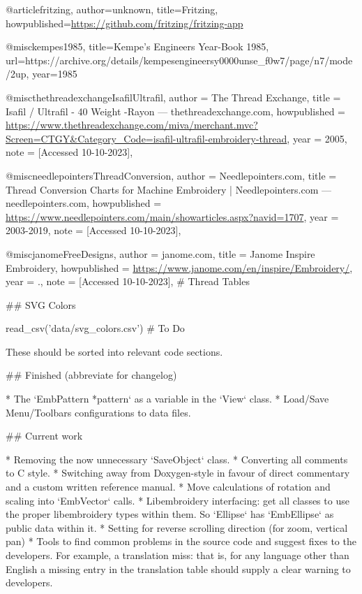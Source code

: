 @article{fritzing,
    author={unknown},
    title={Fritzing},
    howpublished={\url{https://github.com/fritzing/fritzing-app}}
}



@misc{kempes1985,
    title={Kempe's Engineers Year-Book 1985},
    url={https://archive.org/details/kempesengineersy0000unse_f0w7/page/n7/mode/2up},
    year={1985}
}

@misc{thethreadexchangeIsafilUltrafil,
	author = {The Thread Exchange},
	title = {{I}safil / {U}ltrafil - 40 {W}eight -{R}ayon --- thethreadexchange.com},
	howpublished = {\url{https://www.thethreadexchange.com/miva/merchant.mvc?Screen=CTGY&Category_Code=isafil-ultrafil-embroidery-thread}},
	year = {2005},
	note = {[Accessed 10-10-2023]},
}

@misc{needlepointersThreadConversion,
	author = {Needlepointers.com},
	title = {{T}hread {C}onversion {C}harts for {M}achine {E}mbroidery | {N}eedlepointers.com --- needlepointers.com},
	howpublished = {\url{https://www.needlepointers.com/main/showarticles.aspx?navid=1707}},
	year = {2003-2019},
	note = {[Accessed 10-10-2023]},
}

@misc{janomeFreeDesigns,
	author = {janome.com},
	title = {Janome Inspire Embroidery},
	howpublished = {\url{https://www.janome.com/en/inspire/Embroidery/}},
	year = {.},
	note = {[Accessed 10-10-2023]},
}
# Thread Tables

## SVG Colors

{{ read_csv('data/svg_colors.csv') }}
# To Do

These should be sorted into relevant code sections.

## Finished (abbreviate for changelog)

* The `EmbPattern *pattern` as a variable in the `View` class.
* Load/Save Menu/Toolbars configurations to data files.

## Current work

* Removing the now unnecessary `SaveObject` class.
* Converting all comments to C style.
* Switching away from Doxygen-style in favour of direct commentary and a custom written reference manual.
* Move calculations of rotation and scaling into `EmbVector` calls.
* Libembroidery interfacing: get all classes to use the proper libembroidery types within them. So `Ellipse` has `EmbEllipse` as public data within it.
* Setting for reverse scrolling direction (for zoom, vertical pan)
* Tools to find common problems in the source code and suggest fixes to the developers. For example, a translation miss: that is, for any language other than English a missing entry in the translation table should supply a clear warning to developers.

